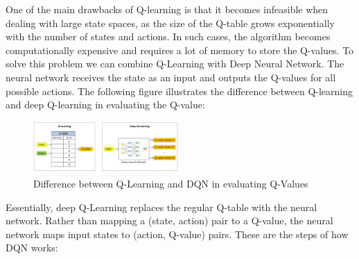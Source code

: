 One of the main drawbacks of Q-learning is that it becomes infeasible when dealing with large state spaces, 
as the size of the Q-table grows exponentially with the number of states and actions. In such cases, 
the algorithm becomes computationally expensive and requires a lot of memory to store the Q-values.
To solve this problem we can combine Q-Learning with Deep Neural Network.
The neural network receives the state as an input and outputs the Q-values for all possible actions. 
The following figure illustrates the difference between Q-learning and deep Q-learning in evaluating the Q-value:
\begin{figure}[h]
    \centering
    \includegraphics[width=0.5\textwidth]{images/q_learning_dqn.png}
    \caption{Difference between Q-Learning and DQN in evaluating Q-Values}
    \label{fig:q_learning_dqn}
\end{figure}
Essentially, deep Q-Learning replaces the regular Q-table with the neural network. Rather than mapping a (state, action)
pair to a Q-value, the neural network maps input states to (action, Q-value) pairs.
These are the steps of how DQN works:
